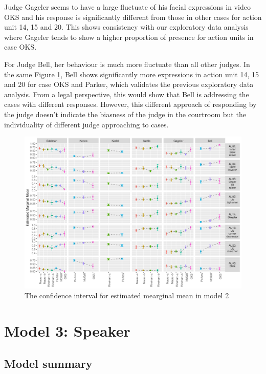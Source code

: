 \documentclass{monashthesis}
\begin{document}
Judge Gageler seems to have a large fluctuate of his facial expressions in video OKS and his response is significantly different from those in other cases for action unit 14, 15 and 20. This shows consistency with our exploratory data analysis where Gageler tends to show a higher proportion of presence for action units in case OKS.

For Judge Bell, her behaviour is much more fluctuate than all other judges. In the same Figure \ref{fig:model2-plot}, Bell shows significantly more expressions in action unit 14, 15 and 20 for case OKS and Parker, which validates the previous exploratory data analysis. From a legal perspective, this would show that Bell is addressing the cases with different responses. However, this different approach of responding by the judge doesn't indicate the biasness of the judge in the courtroom but the individuality of different judge approaching to cases.

\begin{figure}

{\centering \includegraphics[width=1\linewidth]{figures/model2-plot-1} 

}

\caption{The confidence interval for estimated mearginal mean in model 2}\label{fig:model2-plot}
\end{figure}

\hypertarget{model-3-speaker-1}{%
\section{Model 3: Speaker}\label{model-3-speaker-1}}

\hypertarget{model-summary-2}{%
\subsection{Model summary}\label{model-summary-2}}
\end{document}
